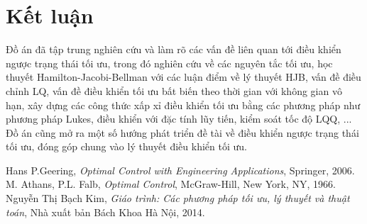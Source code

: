 \documentclass[12pt,a4paper]{report}
\begin{document}
\chapter*{Kết luận}
Đồ án đã tập trung nghiên cứu và làm rõ các vấn đề liên quan tới điều khiển ngược trạng thái tối ưu, trong đó nghiên cứu về các nguyên tắc tối ưu, học thuyết Hamilton-Jacobi-Bellman với các luận điểm về lý thuyết HJB, vấn đề điều chỉnh LQ, vấn đề điều khiển tối ưu bất biến theo thời gian với không gian vô hạn,  xây dựng các công thức xấp xỉ điều khiển tối ưu bằng các phương pháp như phương pháp Lukes, điều khiển với đặc tính lũy tiến, kiểm soát tốc độ LQQ, ... \\
Đồ án cũng mở ra một số hướng phát triển đề tài về điều khiển ngược trạng thái tối ưu, đóng góp chung vào lý thuyết điều khiển tối ưu.
\begin{thebibliography}{}
	 Hans P.Geering, \textit{Optimal Control with Engineering Applications}, Springer, 2006.
	 M. Athans, P.L. Falb, \textit{Optimal Control}, McGraw-Hill, New York, NY, 1966.
	 Nguyễn Thị Bạch Kim, \textit{Giáo trình: Các phương pháp tối ưu, lý thuyết và thuật toán}, Nhà xuất bản Bách Khoa Hà Nội, 2014.
	

	
\end{thebibliography}
\end{document}
